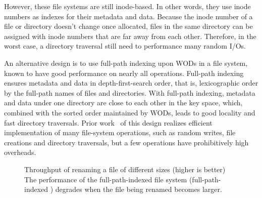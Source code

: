 However, these file systems are still inode-based.
In other words, they use inode numbers as indexes for their metadata and data.
Because the inode number of a file or directory doesn't change once allocated,
files in the same directory can be assigned with inode numbers that
are far away from each other.
Therefore, in the worst case, a directory traversal still need to performance
many random I/Os.

An alternative design is to use full-path indexing upon WODs in a file system,
known to have good performance on nearly all operations.
Full-path indexing ensures metadata and data in depth-first-search order,
that is, lexicographic order by the full-path names of files and directories.
With full-path indexing, metadata and data under one directory are close to each
other in the key space, which, combined with the sorted order maintained by
WODs, leads to good locality and fast directory traversals.
Prior work~\citep{betrfs1,betrfs1tos,betrfs2,betrfs2tos,betrfs3} of this design
realizes efficient implementation of many file-system operations, such as random
writes, file creations and directory traversals,
but a few operations have prohibitively high overheads.

\begin{figure}[t]
    \centering
    \caption[File rename in full-path-indexed file systems]{\label{fig:file_rename_intro}
        Throughput of renaming a file of different sizes (higher is better)
        The performance of the full-path-indexed file system
        (full-path-indexed \betrfsThree)
        degrades when the file being renamed becomes larger.}
\end{figure}

